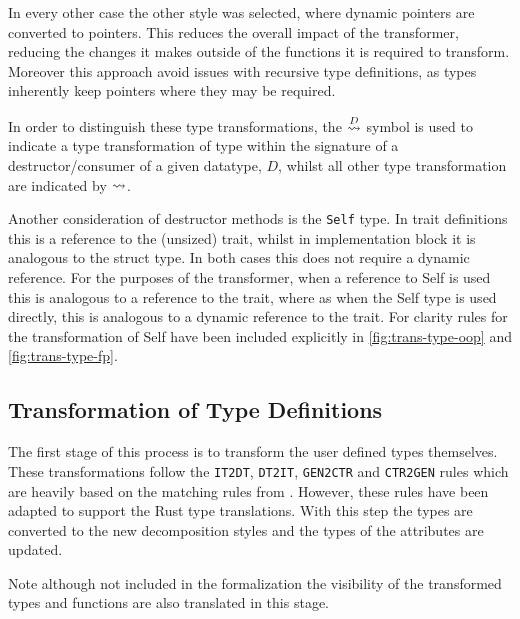 \documentclass[ oneside,%
                    author={James Elgar},
                    degree={MEng},
                     title={Bidirectional transformer between functional and \\ object-oriented programming in Rust},
                  subtitle={}]{dissertation}
\begin{document}
In every other case the other style was selected, where dynamic pointers are converted to pointers. This reduces the overall impact of the transformer, reducing the changes it makes outside of the functions it is required to transform. Moreover this approach avoid issues with recursive type definitions, as types inherently keep pointers where they may be required.

In order to distinguish these type transformations, the $\overset{D}{\leadsto}$ symbol is used to indicate a type transformation of type within the signature of a destructor/consumer of a given datatype, $D$, whilst all other type transformation are indicated by $\overset{}{\leadsto}$.

Another consideration of destructor methods is the \verb|Self| type. In trait definitions this is a reference to the (unsized) trait, whilst in implementation block it is analogous to the struct type. In both cases this does not require a dynamic reference. For the purposes of the transformer, when a reference to Self is used this is analogous to a reference to the trait, where as when the Self type is used directly, this is analogous to a dynamic reference to the trait. For clarity rules for the transformation of Self have been included explicitly in \autoref{fig:trans-type-oop} and \autoref{fig:trans-type-fp}.


\subsection{Transformation of Type Definitions}

The first stage of this process is to transform the user defined types themselves. These transformations follow the \verb|IT2DT|, \verb|DT2IT|, \verb|GEN2CTR| and \verb|CTR2GEN| rules which are heavily based on the matching rules from \cite{food}. However, these rules have been adapted to support the Rust type translations. With this step the types are converted to the new decomposition styles and the types of the attributes are updated.


Note although not included in the formalization the visibility of the transformed types and functions are also translated in this stage. 
\end{document}
